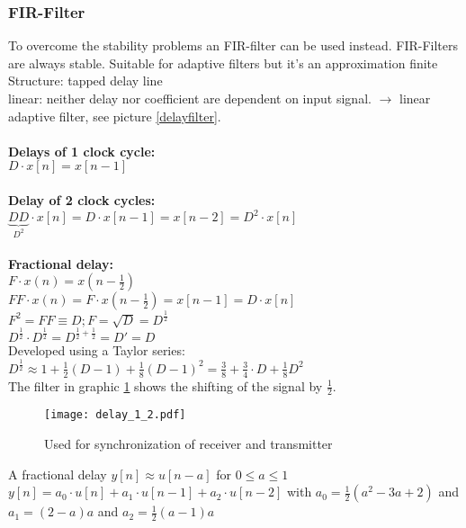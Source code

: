 \subsubsection{FIR-Filter}
To overcome the stability problems an FIR-filter can be used instead. FIR-Filters are always stable.
Suitable for adaptive filters but it's an approximation \pfeil finite \\
Structure: tapped delay line \\
linear: neither delay nor coefficient are dependent on input signal. $\rightarrow$ linear adaptive filter, see picture \ref{delayfilter}.\\ \\

\textbf{Delays of 1 clock cycle:}\\
$D\cdot x[n] = x[n-1]$\\ \\
\textbf{Delay of 2 clock cycles:}\\
$\underbrace{DD}_{D^2}\cdot x[n] = D \cdot x[n-1] = x[n-2]= D^2\cdot x[n] $\\ \\

\textbf{Fractional delay:}\\
$F \cdot x(n) = x(n-\frac{1}{2})$\\
$FF \cdot x(n) = F \cdot x(n-\frac{1}{2}) = x[n-1] = D \cdot x[n]$\\
$F^2 = FF  	\equiv D ; F= \sqrt{D} = D^{\frac{1}{2}}$\\
$D^{\frac{1}{2}} \cdot D^{\frac{1}{2}} = D^{\frac{1}{2}+\frac{1}{2}} = D' =D$ \\
Developed using a Taylor series: $D^{\frac{1}{2}} \approx  1+\frac{1}{2}(D-1)+ \frac{1}{8}(D-1)^2 = \frac{3}{8}+\frac{3}{4}\cdot D + \frac{1}{8} D^2$\\
The filter in graphic \ref{delayfilter1_2} shows the shifting of the signal by $\frac{1}{2}$.
\begin{figure}[H]
	\centering
	\texttt{[image: delay\_1\_2.pdf]}
	\caption{Used for synchronization of receiver and transmitter}
	\label{delayfilter1_2} 
\end{figure}

A fractional delay $y[n] \approx u[n-a] $ for $0 \leq a \leq 1$ \\
$y[n] = a_0 \cdot u[n] + a_1 \cdot u[n-1] + a_2 \cdot u[n-2] $ with $ a_0 = \frac{1}{2} (a^2 - 3a + 2)$ and $a_1 = (2-a)a$ and $a_2= \frac{1}{2} (a-1) a $\\

